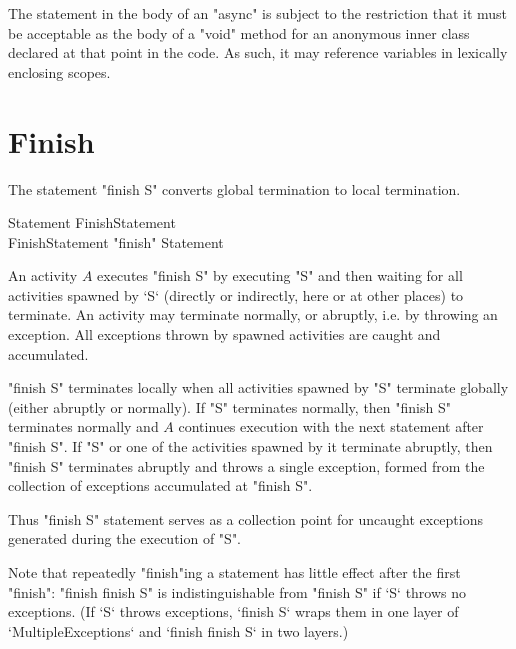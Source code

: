 \begin{staticrule*}
The statement in the body of an \xcd"async" is subject to the
restriction that it must be acceptable as the body of a \xcd"void"
method for an anonymous inner class declared at that point in the code. As
such, it may reference variables in lexically enclosing scopes.
\end{staticrule*}

\section{Finish}\label{finish}
The statement \xcd"finish S" converts global termination to local
termination.

\begin{grammar}
Statement \: FinishStatement \\
FinishStatement \: \xcd"finish" Statement 
\end{grammar}

An activity $A$ executes \xcd"finish S" by executing \xcd"S" and
then waiting for all activities spawned by \xcd`S` (directly or
indirectly, here or at other places) to terminate. An activity may
terminate normally, or abruptly, i.e. by throwing an exception.
All exceptions thrown by spawned activities are caught and
accumulated. 

\xcd"finish S" terminates locally when all activities spawned by
\xcd"S" terminate globally (either abruptly or normally). If \xcd"S"
terminates normally, then \xcd"finish S" terminates normally and $A$
continues execution with the next statement after \xcd"finish S".  If
\xcd"S" or one of the activities spawned by it terminate abruptly,
then \xcd"finish S" terminates abruptly and throws a single exception,
 formed from the collection of
exceptions accumulated at \xcd"finish S".

Thus \xcd"finish S" statement serves as a collection point for
uncaught exceptions generated during the execution of \xcd"S".

Note that repeatedly \xcd"finish"ing a statement has little effect after
the first \xcd"finish": \xcd"finish finish S" is indistinguishable
from \xcd"finish S" if \xcd`S` throws no exceptions.  (If \xcd`S` throws
exceptions, \xcd`finish S` wraps them in one layer of 
\xcd`MultipleExceptions` and \xcd`finish finish S` in two layers.)

